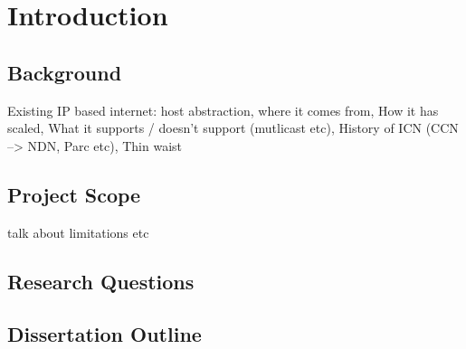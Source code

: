 \chapter{Introduction}
\cite{nfd-dev-guide}
\section{Background}
Existing IP based internet: host abstraction, where it comes from, How it has scaled, What it supports / doesn't support (mutlicast etc), History of ICN (CCN --> NDN, Parc etc), Thin waist

\section{Project Scope}
talk about limitations etc

\section{Research Questions}

\section{Dissertation Outline}